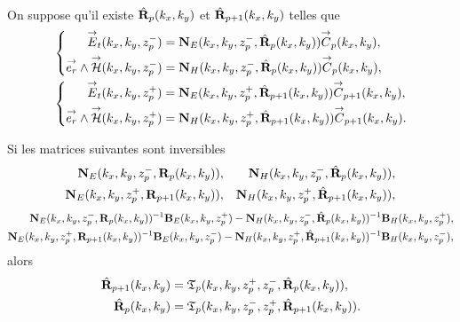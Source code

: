     \begin{prop}%
      \label{prop:plan:synthese:reflexion}{}~

      On suppose qu'il existe \(\hat{\mathbf{R}}_{p}(k_x,k_y)\) et \(\hat{\mathbf{R}}_{p+1}(k_x,k_y)\) telles que 
      \begin{align*}
      &\left\lbrace\begin{aligned}
        {\overset{\rightarrow}{E}}_t(k_x,k_y,z_p^-) &= \mathbf{N}_{E}(k_x,k_y,z_p^-,\hat{\mathbf{R}}_{p}(k_x,k_y)){\overset{\rightarrow}{C}}_{p}(k_x,k_y),
        \\
        {\overset{\rightarrow}{e_r}}\wedge{\overset{\rightarrow}{\mathcal{H}}}(k_x,k_y,z_p^-) &= \mathbf{N}_{H}(k_x,k_y,z_p^-,\hat{\mathbf{R}}_{p}(k_x,k_y)){\overset{\rightarrow}{C}}_{p}(k_x,k_y),
        \end{aligned}
      \right.
      \\
      &\left\lbrace\begin{aligned}
        {\overset{\rightarrow}{E}}_t(k_x,k_y,z_p^+) &= \mathbf{N}_{E}(k_x,k_y,z_p^+,\hat{\mathbf{R}}_{p+1}(k_x,k_y)){\overset{\rightarrow}{C}}_{p+1}(k_x,k_y),
        \\
        {\overset{\rightarrow}{e_r}}\wedge{\overset{\rightarrow}{\mathcal{H}}}(k_x,k_y,z_p^+) &= \mathbf{N}_{H}(k_x,k_y,z_p^+,\hat{\mathbf{R}}_{p+1}(k_x,k_y)){\overset{\rightarrow}{C}}_{p+1}(k_x,k_y).
        \end{aligned}
      \right.      
      \end{align*}

      Si les matrices suivantes sont inversibles
      \begin{align*}
        \mathbf{N}_{E}(k_x,k_y,z_p^-,\mathbf{R}_{p}(k_x,k_y)), && \mathbf{N}_{H}(k_x,k_y,z_p^-,\hat{\mathbf{R}}_{p}(k_x,k_y)),
        \\
        \mathbf{N}_{E}(k_x,k_y,z_p^+,\mathbf{R}_{p+1}(k_x,k_y)), && \mathbf{N}_{H}(k_x,k_y,z_p^+,\hat{\mathbf{R}}_{p+1}(k_x,k_y)),
      \end{align*}
      \begin{align*}
        \mathbf{N}_{E}(k_x,k_y,z_p^-,\mathbf{R}_{p}(k_x,k_y))^{-1}\mathbf{B}_{E}(k_x,k_y,z_p^+) - \mathbf{N}_{H}(k_x,k_y,z_p^-,\hat{\mathbf{R}}_{p}(k_x,k_y))^{-1}\mathbf{B}_{H}(k_x,k_y,z_p^+),
        \\
        \mathbf{N}_{E}(k_x,k_y,z_p^+,\mathbf{R}_{p+1}(k_x,k_y))^{-1}\mathbf{B}_{E}(k_x,k_y,z_p^-) - \mathbf{N}_{H}(k_x,k_y,z_p^+,\hat{\mathbf{R}}_{p+1}(k_x,k_y))^{-1}\mathbf{B}_{H}(k_x,k_y,z_p^-),
      \end{align*}
      alors
      \begin{align*}
        \hat{\mathbf{R}}_{p+1}(k_x,k_y) &= \mathfrak{T}_p(k_x,k_y,z_p^+,z_p^-,\hat{\mathbf{R}}_{p}(k_x,k_y)),
        \\
        \hat{\mathbf{R}}_{p}(k_x,k_y) &= \mathfrak{T}_p(k_x,k_y,z_p^-,z_p^+,\hat{\mathbf{R}}_{p+1}(k_x,k_y)).
      \end{align*}
    \end{prop}

